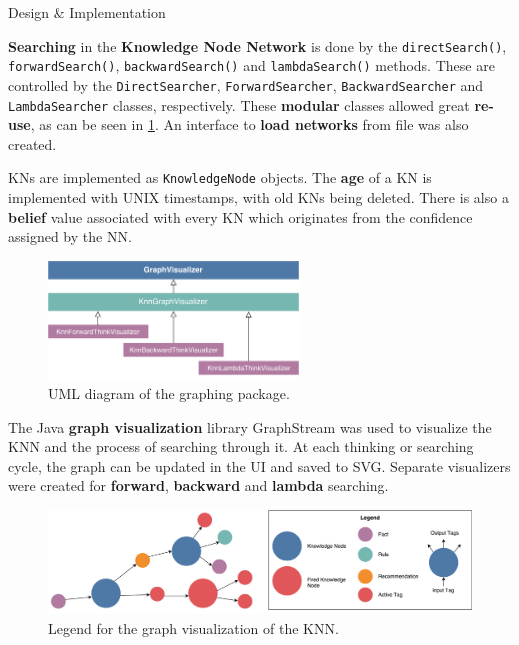 \documentclass[final]{beamer} %
\newcommand{\code}[1]{\texttt{#1}}
\begin{document}
\begin{frame}
\begin{columns}
\begin{column}{.33\textwidth}
{\begin{block}{Design \& Implementation}
					\parbox{0.99\textwidth}{
					 \textbf{Searching} in the \textbf{Knowledge Node Network} is done by the \code{directSearch()}, \code{forwardSearch()}, \code{backwardSearch()} and \code{lambdaSearch()} methods. These are controlled by the \code{DirectSearcher}, \code{ForwardSearcher}, \code{BackwardSearcher} and \code{LambdaSearcher} classes, respectively. These \textbf{modular} classes allowed great \textbf{re-use}, as can be seen in \cref{fig:uml_knn}. An interface to \textbf{load networks} from file was also created.
					 
					 KNs are implemented as \code{KnowledgeNode} objects. The \textbf{age} of a KN is implemented with UNIX timestamps, with old KNs being deleted. There is also a \textbf{belief} value associated with every KN which originates from the confidence assigned by the NN.}
			
					\begin{figure}
						\centering
						\includegraphics[width=0.593\textwidth]{figures/uml_graphing.pdf}
						\caption{UML diagram of the graphing package.}
						\label{fig:uml_knn}
					\end{figure}
				
				\parbox{0.99\textwidth}{
				The Java \textbf{graph visualization} library GraphStream was used to visualize the KNN and the process of searching through it. At each thinking or searching cycle, the graph can be updated in the UI and saved to SVG. Separate visualizers were created for \textbf{forward}, \textbf{backward} and \textbf{lambda} searching.}
					
					\begin{figure}[!htb]
						\centering
						\includegraphics[width=\columnwidth]{figures/knn_graph_legend.pdf}
						\caption
						{Legend for the graph visualization of the KNN.}
						\label{fig:knn_legend}
					\end{figure}
				

\end{block}}
\end{column}
\end{columns}
\end{frame}
\end{document}
